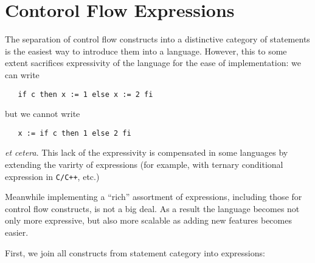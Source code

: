 \documentclass{article}
\author{Dmitry Boulytchev}
\theoremstyle{definition}
\begin{document}
\section{Contorol Flow Expressions}

The separation of control flow constructs into a distinctive category of statements is the easiest way to introduce them into a language.
However, this to some extent sacrifices expressivity of the language for the ease of implementation: we can write

\begin{lstlisting}
   if c then x := 1 else x := 2 fi
\end{lstlisting}

but we cannot write

\begin{lstlisting}
   x := if c then 1 else 2 fi
\end{lstlisting}

\emph{et cetera}. This lack of the expressivity is compensated in some languages by extending the varirty of expressions (for example,
with ternary conditional expression in \texttt{C/C++}, etc.)

Meanwhile implementing a ``rich'' assortment of expressions, including those for control flow constructs, is not a big deal. As a result
the language becomes not only more expressive, but also more scalable as adding new features becomes easier.

First, we join all constructs from statement category into expressions:
\end{document}

